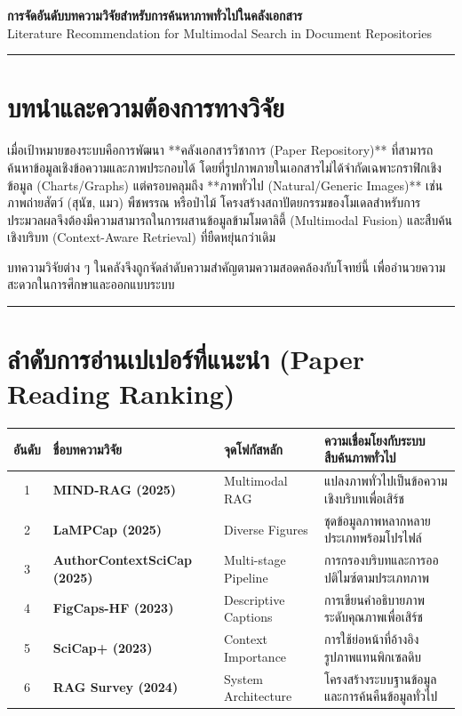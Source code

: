 \documentclass[10pt,a4paper]{article}
\begin{document}
\begin{center}
  {\Large \textbf{การจัดอันดับบทความวิจัยสำหรับการค้นหาภาพทั่วไปในคลังเอกสาร}}\\[6pt]
  {\color{muted}\small Literature Recommendation for Multimodal Search in Document Repositories}
\end{center}

\noindent\rule{\textwidth}{1.5pt}

\section*{บทนำและความต้องการทางวิจัย}

เมื่อเป้าหมายของระบบคือการพัฒนา **คลังเอกสารวิชาการ (Paper Repository)** ที่สามารถค้นหาข้อมูลเชิงข้อความและภาพประกอบได้ โดยที่รูปภาพภายในเอกสารไม่ได้จำกัดเฉพาะกราฟิกเชิงข้อมูล (Charts/Graphs) แต่ครอบคลุมถึง **ภาพทั่วไป (Natural/Generic Images)** เช่น ภาพถ่ายสัตว์ (สุนัข, แมว) พืชพรรณ หรือป่าไม้ โครงสร้างสถาปัตยกรรมของโมเดลสำหรับการประมวลผลจึงต้องมีความสามารถในการผสานข้อมูลข้ามโมดาลิตี้ (Multimodal Fusion) และสืบค้นเชิงบริบท (Context-Aware Retrieval) ที่ยืดหยุ่นกว่าเดิม

บทความวิจัยต่าง ๆ ในคลังจึงถูกจัดลำดับความสำคัญตามความสอดคล้องกับโจทย์นี้ เพื่ออำนวยความสะดวกในการศึกษาและออกแบบระบบ

\vspace{12pt}
\noindent\rule{\textwidth}{0.4pt}

\section*{ลำดับการอ่านเปเปอร์ที่แนะนำ (Paper Reading Ranking)}

\begin{tabular}{@{}clll@{}}
  \textbf{อันดับ} & \textbf{ชื่อบทความวิจัย} & \textbf{จุดโฟกัสหลัก} & \textbf{ความเชื่อมโยงกับระบบสืบค้นภาพทั่วไป} \\ \hline
  1 & \textbf{MIND-RAG (2025)} & Multimodal RAG & แปลงภาพทั่วไปเป็นข้อความเชิงบริบทเพื่อเสิร์ช \\
  2 & \textbf{LaMPCap (2025)} & Diverse Figures & ชุดข้อมูลภาพหลากหลายประเภทพร้อมโปรไฟล์ \\
  3 & \textbf{AuthorContextSciCap (2025)} & Multi-stage Pipeline & การกรองบริบทและการออปติไมซ์ตามประเภทภาพ \\
  4 & \textbf{FigCaps-HF (2023)} & Descriptive Captions & การเขียนคำอธิบายภาพระดับคุณภาพเพื่อเสิร์ช \\
  5 & \textbf{SciCap+ (2023)} & Context Importance & การใช้ย่อหน้าที่อ้างอิงรูปภาพแทนพิกเซลดิบ \\
  6 & \textbf{RAG Survey (2024)} & System Architecture & โครงสร้างระบบฐานข้อมูลและการค้นคืนข้อมูลทั่วไป \\
\end{tabular}
\end{document}
